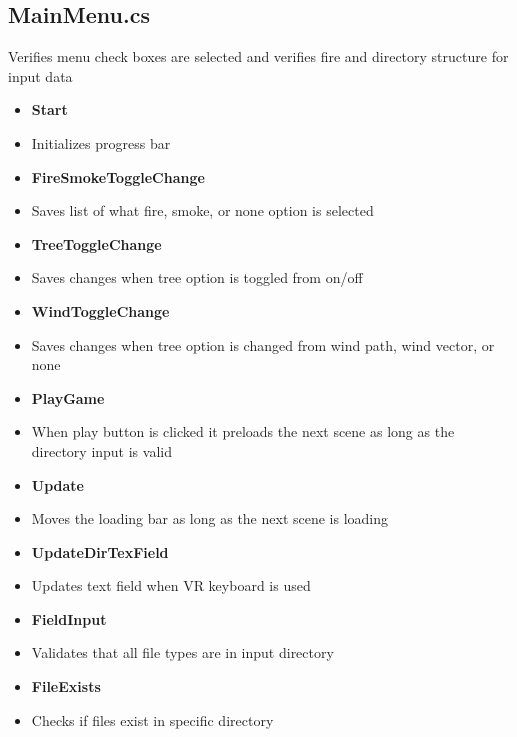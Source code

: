 \subsection{MainMenu.cs}
 Verifies menu check boxes are selected and verifies fire and directory structure for input data
\begin{itemize}
    \item \textbf{ Start}
    \item[] Initializes progress bar

    \item \textbf{FireSmokeToggleChange}
    \item[] Saves list of what fire, smoke, or none option is selected
    
    \item \textbf{TreeToggleChange}
    \item[] Saves changes when tree option is toggled from on/off
    
    \item \textbf{WindToggleChange}
    \item[] Saves changes when tree option is changed from wind path, wind vector, or none
    
     
    \item \textbf{PlayGame}
    \item[] When play button is clicked it preloads the next scene as long as the directory input is valid
    
    \item \textbf{Update}
    \item[] Moves the loading bar as long as the next scene is loading

    \item \textbf{ UpdateDirTexField}
    \item[] Updates text field when VR keyboard is used


    \item \textbf{ FieldInput}
    \item[] Validates that all file types are in input directory
    
    \item \textbf{FileExists}
    \item[] Checks if files exist in specific directory 
\end{itemize}


